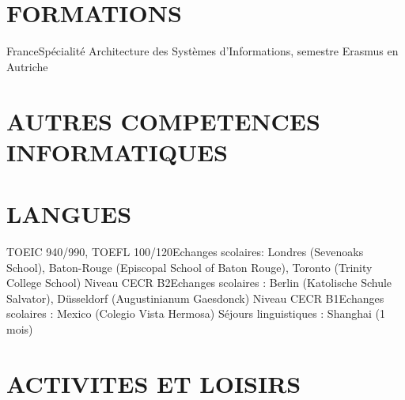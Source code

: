 \documentclass[11pt,a4paper]{moderncv}
\begin{document}
\section{FORMATIONS}

{France}{}{Spécialité Architecture des
Systèmes d’Informations, semestre Erasmus en Autriche}{}{}


\section{AUTRES COMPETENCES INFORMATIQUES}

\section{LANGUES}
{}{TOEIC 940/990, TOEFL 100/120}{Echanges scolaires: Londres (Sevenoaks School), Baton-Rouge (Episcopal School of Baton Rouge), Toronto (Trinity College School)}
{}{Niveau CECR B2}{Echanges scolaires : Berlin (Katolische Schule Salvator), Düsseldorf (Augustinianum Gaesdonck)}
{}{Niveau CECR B1}{Echanges scolaires : Mexico (Colegio Vista Hermosa)}
{}{}{Séjours linguistiques : Shanghai (1 mois)}

\section{ACTIVITES ET LOISIRS}


\nocite{*}

\end{document}
